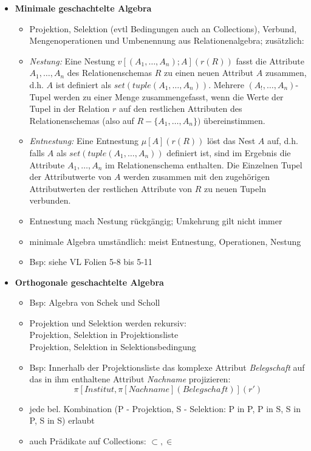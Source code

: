 \begin{itemize}
	\item \textbf{Minimale geschachtelte Algebra}
	\begin{itemize}
		\item Projektion, Selektion (evtl Bedingungen auch an Collections), Verbund, Mengenoperationen und Umbenennung aus Relationenalgebra; zusätzlich:
		\item \textit{Nestung:} Eine Nestung $v[(A_1, \ldots, A_n);A](r(R))$ fasst die Attribute $A_1, \ldots, A_n$ des Relationenschemas $R$ zu einen neuen Attribut $A$ zusammen, d.h. $A$ ist definiert als $set(tuple(A_1, \ldots, A_n))$. Mehrere $(A_!, \ldots, A_n)$-Tupel werden zu einer Menge zusammengefasst, wenn die Werte der Tupel in der Relation $r$ auf den restlichen Attributen des Relationenschemas (also auf $R - \{A_1, \ldots, A_n\})$ übereinstimmen.
		
		\item \textit{Entnestung:} Eine Entnestung $\mu[A](r(R))$ löst das Nest $A$ auf, d.h. falls $A$ als $set(tuple(A_1, \ldots, A_n))$ definiert ist, sind im Ergebnis die Attribute $A_1, \ldots, A_n$ im Relationenschema enthalten. Die Einzelnen Tupel der Attributwerte von $A$ werden zusammen mit den zugehörigen Attributwerten der restlichen Attribute von $R$ zu neuen Tupeln verbunden.
		
		\item Entnestung mach Nestung rückgängig; Umkehrung gilt nicht immer
		\item minimale Algebra umständlich: meist Entnestung, Operationen, Nestung
		\item Bsp: siehe VL Folien 5-8 bis 5-11
	\end{itemize}
	
	\item \textbf{Orthogonale geschachtelte Algebra}
	\begin{itemize}
		\item Bsp: Algebra von Schek und Scholl
		\item Projektion und Selektion werden rekursiv:\\
		Projektion, Selektion in Projektionsliste\\
		Projektion, Selektion in Selektionsbedingung
		\item Bsp: Innerhalb der Projektionsliste das komplexe Attribut \textit{Belegschaft} auf das in ihm enthaltene Attribut \textit{Nachname} projizieren:
		\[\pi [Institut, \pi[Nachname](Belegschaft)](r') \]
		\item jede bel. Kombination (P - Projektion, S - Selektion: P in P, P in S, S in P, S in S) erlaubt
		\item auch Prädikate auf Collections: $\subset, \in$
	\end{itemize}
	

\end{itemize}
